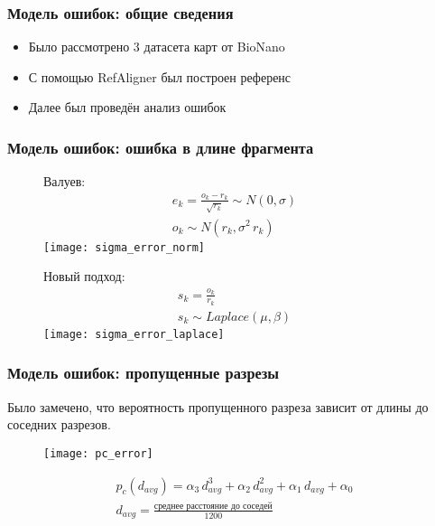 \begin{frame}
\frametitle{Модель ошибок: общие сведения}
\begin{itemize}
  \item Было рассмотрено 3 датасета карт от BioNano
  \item С помощью RefAligner был построен референс
  \item Далее был проведён анализ ошибок
\end{itemize}
\end{frame}

\begin{frame}
\frametitle{Модель ошибок: ошибка в длине фрагмента}


\begin{figure}
\centering
\begin{minipage}{.5\textwidth}
  Валуев:
  \begin{gather*}
  e_k = \frac{o_k - r_k}{\sqrt{r_k}} \sim N(0, \sigma) \\
  o_k \sim N(r_k, \sigma^2 \, r_k)
  \end{gather*}
  \centering
  \texttt{[image: sigma\_error\_norm]}
\end{minipage}%
\begin{minipage}{.5\textwidth}
  Новый подход:
  \begin{gather*}
  s_k = \frac{o_k}{r_k} \\
  s_k \sim Laplace(\mu, \beta)
  \end{gather*}
  \centering
  \texttt{[image: sigma\_error\_laplace]}
\end{minipage}
\end{figure}
\end{frame}

\begin{frame}
\frametitle{Модель ошибок: пропущенные разрезы}
Было замечено, что вероятность пропущенного разреза зависит от длины до соседних разрезов.
\begin{figure}
  \centering
  \texttt{[image: pc\_error]}
\end{figure}
\begin{gather*}
p_c (d_{avg}) = \alpha_3 \, d_{avg}^3 + \alpha_2 \, d_{avg}^2 +  \alpha_1 \, d_{avg} + \alpha_0 \\
d_{avg} = \frac{\text{среднее расстояние до соседей}}{1200}
\end{gather*}
\end{frame}

